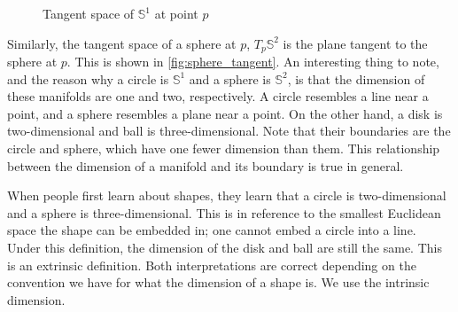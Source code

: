 \documentclass[a4paper,12pt]{article}
\begin{document}
\begin{figure}[!htbp]
\centering
{}
\caption{Tangent space of $\mathbb{S}^1$ at point $p$}
\label{fig:circle_tangent}
\end{figure}

Similarly, the tangent space of a sphere at $p$, $T_p\mathbb{S}^2$ is the plane tangent to the sphere at $p$.
This is shown in \cref{fig:sphere_tangent}.
An interesting thing to note, and the reason why a circle is $\mathbb{S}^1$ and a sphere is $\mathbb{S}^2$, is that the dimension of these manifolds are one and two, respectively.
A circle resembles a line near a point, and a sphere resembles a plane near a point.
On the other hand, a disk is two-dimensional and ball is three-dimensional.
Note that their boundaries are the circle and sphere, which have one fewer dimension than them.
This relationship between the dimension of a manifold and its boundary is true in general.

When people first learn about shapes, they learn that a circle is two-dimensional and a sphere is three-dimensional.
This is in reference to the smallest Euclidean space the shape can be embedded in; one cannot embed a circle into a line.
Under this definition, the dimension of the disk and ball are still the same.
This is an extrinsic definition.
Both interpretations are correct \cite{shape_dimension_convention} depending on the convention we have for what the dimension of a shape is.
We use the intrinsic dimension.
\end{document}
